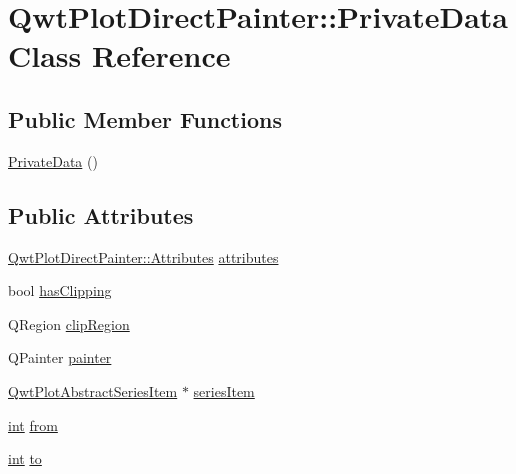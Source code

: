 \hypertarget{class_qwt_plot_direct_painter_1_1_private_data}{\section{Qwt\-Plot\-Direct\-Painter\-:\-:Private\-Data Class Reference}
\label{class_qwt_plot_direct_painter_1_1_private_data}
}
\subsection*{Public Member Functions}
\begin{DoxyCompactItemize}
\item 
\hyperlink{class_qwt_plot_direct_painter_1_1_private_data_a5637d711bc67aa7ce57c0ded6746741b}{Private\-Data} ()
\end{DoxyCompactItemize}
\subsection*{Public Attributes}
\begin{DoxyCompactItemize}
\item 
\hyperlink{class_qwt_plot_direct_painter_a26a66587377067b3bc0539274370693f}{Qwt\-Plot\-Direct\-Painter\-::\-Attributes} \hyperlink{class_qwt_plot_direct_painter_1_1_private_data_a99a8e9fe00057a319f29bd98581cb092}{attributes}
\item 
bool \hyperlink{class_qwt_plot_direct_painter_1_1_private_data_ae0558f5fbe8f5a3f638c0d4fa54989e9}{has\-Clipping}
\item 
Q\-Region \hyperlink{class_qwt_plot_direct_painter_1_1_private_data_a77053766ff9e1ffa48e38ee5326cfce6}{clip\-Region}
\item 
Q\-Painter \hyperlink{class_qwt_plot_direct_painter_1_1_private_data_a130cce4ec8a45c988d75e9bfd96c0420}{painter}
\item 
\hyperlink{class_qwt_plot_abstract_series_item}{Qwt\-Plot\-Abstract\-Series\-Item} $\ast$ \hyperlink{class_qwt_plot_direct_painter_1_1_private_data_a1e51aa93d4fd8cad0a6f6e82bf7e19cf}{series\-Item}
\item 
\hyperlink{ioapi_8h_a787fa3cf048117ba7123753c1e74fcd6}{int} \hyperlink{class_qwt_plot_direct_painter_1_1_private_data_a9b94933522733ae1681562d32f69c668}{from}
\item 
\hyperlink{ioapi_8h_a787fa3cf048117ba7123753c1e74fcd6}{int} \hyperlink{class_qwt_plot_direct_painter_1_1_private_data_a549ce58b40dba76c27d40291b2c8f214}{to}
\end{DoxyCompactItemize}


